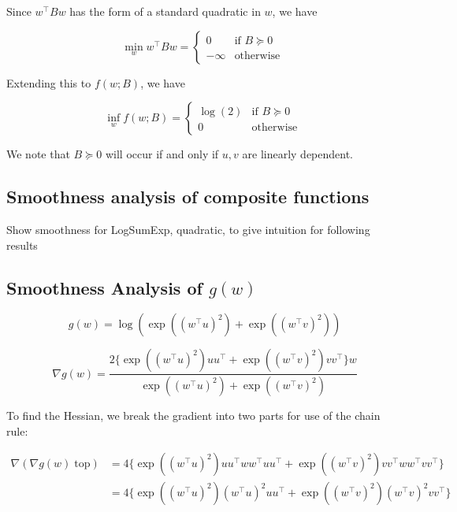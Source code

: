\documentclass[11pt]{article}
\begin{document}
Since $w^{\top}Bw$ has the form of a standard quadratic in $w$, we have

\begin{equation}
    \min_{w} w^{\top}Bw = \begin{cases} 
    0 &\mbox{if } B \succeq 0 \\
    -\infty & \mbox{otherwise } \end{cases}
\end{equation}

Extending this to $f(w; B)$, we have

\begin{equation}
    \inf_{w} f(w; B) = \begin{cases} 
    \log(2) &\mbox{if } B \succeq 0 \\
    0 & \mbox{otherwise } \end{cases}
\end{equation}

We note that $B \succeq 0$ will occur if and only if $u, v$ are linearly dependent.

\subsection{Smoothness analysis of composite functions}

Show smoothness for LogSumExp, quadratic, to give intuition for following results

\subsection{Smoothness Analysis of $g(w)$}

\begin{equation}
    g(w) = \log( \exp((w^{\top}u)^2) + \exp((w^{\top}v)^2) )
\end{equation}

\begin{equation}
    \nabla g(w) 
    = \frac{ 2 \{ \exp((w^{\top}u)^2)uu^{\top} + \exp((w^{\top}v)^2)vv^{\top}  \} w}{ \exp((w^{\top}u)^2) + \exp((w^{\top}v)^2) }
\end{equation}

To find the Hessian, we break the gradient into two parts for use of the chain rule:

\begin{align*}
    \nabla (\nabla g(w) \; \textrm{top}) 
    &= 4 \{ \exp((w^{\top}u)^2)uu^{\top}ww^{\top}uu^{\top} + \exp((w^{\top}v)^2)vv^{\top}ww^{\top}vv^{\top} \} \\
    &= 4 \{ \exp((w^{\top}u)^2)(w^{\top}u)^2 uu^{\top} + \exp((w^{\top}v)^2)(w^{\top}v)^2 vv^{\top} \}
\end{align*}
\end{document}
